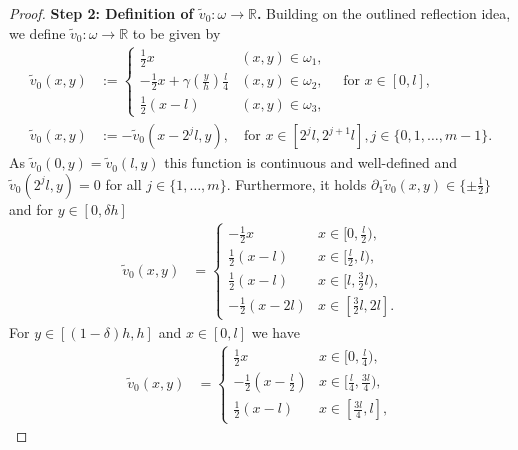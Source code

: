 \documentclass[a4paper, 10pt, twoside, notitlepage]{amsart}
\theoremstyle{plain}
\newcommand{\R}{\mathbb{R}}
\newcommand{\p}{\partial}
\begin{document}
\begin{proof}
                            \textbf{Step 2: Definition of $\tilde{v}_0: \omega \to \R$.}
                          Building on the outlined reflection idea, we define $\tilde{v}_0: \omega \to \R$ to be given by
                          \begin{align*}
                            \tilde{v}_0(x,y) & :=
                            \begin{cases}
                              \frac{1}{2} x & (x,y) \in \omega_1, \\
                              -\frac{1}{2}x + \gamma(\frac{y}{h}) \frac{l}{4} & (x,y) \in \omega_2, \\
                              \frac{1}{2}(x-l) & (x,y) \in \omega_3,
                            \end{cases}
                                               \quad \text{for } x \in [0,l], \\
                            \tilde{v}_0(x,y) & := - \tilde{v}_0(x-2^jl,y), \quad \text{for } x \in [2^jl,2^{j+1}l], j\in \{0,1,\dots,m-1\}.
                          \end{align*}
                          As $\tilde{v}_0(0,y) = \tilde{v}_0(l,y)$ this function is continuous and well-defined and $\tilde{v}_0(2^j l,y) = 0$ for all $j\in\{1,\dots,m\}$.
                          Furthermore, it holds $\p_1 \tilde{v}_0(x,y) \in \{\pm \frac{1}{2} \}$ and for $y \in [0,\delta h]$
                          \begin{align*}
                            \tilde{v}_0(x,y) &= \begin{cases} - \frac{1}{2} x &x \in [0,\frac{l}{2}), \\ \frac{1}{2}(x-l) & x \in [\frac{l}{2},l),\\
\frac{1}{2}(x-l) & x\in [l, \frac{3}{2}l),\\
-\frac{1}{2}(x- 2l) & x\in [ \frac{3}{2}l, 2l].                           
                             \end{cases} 
                          \end{align*}
                          For $y \in [(1-\delta)h,h]$ and $x \in [0,l]$ we have
                          \begin{align*}
                            \tilde{v}_0(x,y) &= \begin{cases} \frac{1}{2} x & x \in [0,\frac{l}{4}), \\ -\frac{1}{2}(x-\frac{l}{2}) & x \in [\frac{l}{4},\frac{3l}{4}), \\ \frac{1}{2}(x-l) & x \in [\frac{3l}{4},l], \end{cases}

\end{align*}
\end{proof}
\end{document}
